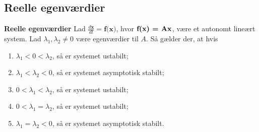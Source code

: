 \subsection{Reelle egenværdier}

\begin{thmx} \textbf{Reelle egenværdier} %
\newline
Lad $\frac{d\textbf{x}}{dt} = \textbf{f(x)}$, hvor $\textbf{f(x) = A\textbf{x}}$, være et autonomt lineært system. Lad $\lambda_1,\lambda_2\neq 0$ være egenværdier til $A$. Så gælder der, at hvis
\begin{enumerate}
    \item $\lambda_1<0<\lambda_2$, så er systemet ustabilt;
    \item $\lambda_1<\lambda_2<0$, så er systemet asymptotisk stabilt;
    \item $0<\lambda_1<\lambda_2$, så er systemet ustabilt;
    \item $0<\lambda_1=\lambda_2$, så er systemet ustabilt;
    \item $\lambda_1=\lambda_2 < 0$, så er systemet asymptotisk stabilt.
\end{enumerate}
\end{thmx}

